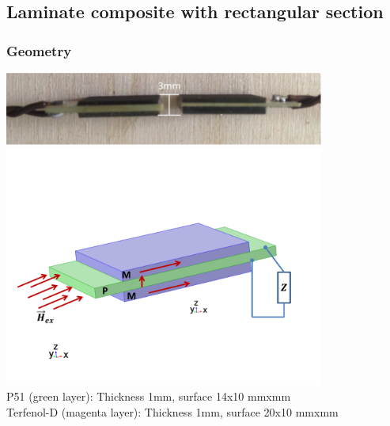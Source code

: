 \documentclass[compress]{beamer}
\begin{document}
\subsection{Laminate composite with rectangular section}
\begin{frame}\frametitle{Geometry}
\centering
\includegraphics[width=0.79\textwidth]{Graphic/03_MEsample}
\includegraphics[width=0.79\textwidth]{Graphic/03_georecta.pdf}\\

{
P51 (green layer): Thickness 1mm, surface 14x10 mmxmm \\
Terfenol-D (magenta layer): Thickness 1mm, surface 20x10 mmxmm	
}
\end{frame}
\end{document}
